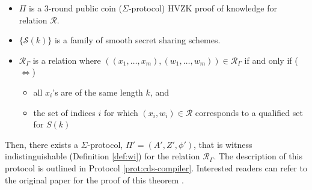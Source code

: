 \begin{itemize}
    \item $\Pi$ is a 3-round public coin ($\Sigma$-protocol) HVZK proof of knowledge for relation $\mathcal R$.
    \item $\{\mathcal S(k)\}$ is a family of smooth secret sharing schemes.
    \item $\mathcal R_\Gamma$ is a relation where $((x_1,\ldots,x_m),(w_1,\ldots,w_m)) \in \mathcal R_\Gamma$ if and only if ($\iff$)
    \begin{itemize}
        \item all $x_i$'s are of the same length $k$, and 
        \item the set of indices $i$ for which $(x_i,w_i) \in \mathcal R$ corresponds to a qualified set for $S(k)$
    \end{itemize}
\end{itemize}

Then, there exists a $\Sigma$-protocol, $\Pi' = (A', Z', \phi')$, that is witness indistinguishable 
(Definition \ref{def:wi}) for the relation $\mathcal R_\Gamma$. The description of this protocol is outlined in 
Protocol \ref{prot:cds-compiler}. Interested readers can refer to the original paper for the proof of this theorem \cite{CDS94}. 

